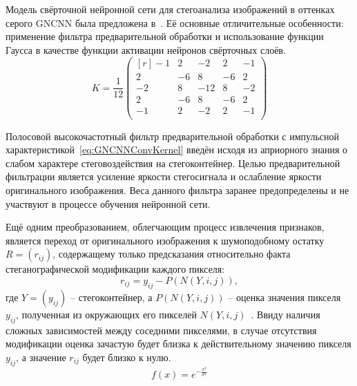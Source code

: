 Модель свёрточной нейронной сети для стегоанализа изображений в оттенках серого GNCNN была предложена в~\cite{GNCNN}. Её основные отличительные особенности: применение фильтра предварительной обработки и использование функции Гаусса в качестве функции активации нейронов свёрточных слоёв.
\begin{equation}
\label{eq:GNCNNConvKernel}
K = \frac{1}{12}
\begin{pmatrix*}[r]
    -1 &  2 &    -2 &  2 & -1 \\
     2 & -6 &     8 & -6 &  2 \\
    -2 &  8 & -12 &  8 & -2 \\
     2 & -6 &     8 & -6 &  2 \\
    -1 &  2 &    -2 &  2 & -1 \\
\end{pmatrix*}
\end{equation}

Полосовой высокочастотный фильтр предварительной обработки с импульсной характеристикой~\eqref{eq:GNCNNConvKernel} введён исходя из априорного знания о слабом характере стеговоздействия на стегоконтейнер. Целью предварительной фильтрации является усиление яркости стегосигнала и ослабление яркости оригинального изображения. Веса данного фильтра заранее предопределены и не участвуют в процессе обучения нейронной сети.

Ещё одним преобразованием, облегчающим процесс извлечения признаков, является переход от оригинального изображения к шумоподобному остатку $ R = (r_{ij}) $, содержащему только предсказания относительно факта стеганографической модификации каждого пикселя:
\begin{equation*}
r_{ij} = y_{ij} - P(N(Y, i, j)),
\end{equation*}
где $ Y = (y_{ij}) $ – стегоконтейнер, а $ P(N(Y, i, j)) $ – оценка значения пикселя $ y_{ij} $, полученная из окружающих его пикселей $ N(Y, i, j) $~\cite{FridrichNoiseResidual}. Ввиду наличия сложных зависимостей между соседними пикселями, в случае отсутствия модификации оценка зачастую будет близка к действительному значению пикселя $ y_{ij} $, а значение $ r_{ij} $ будет близко к нулю.
\begin{equation}
\label{eq:GaussianFunction}
f(x) = e^{-\frac{x^2}{\sigma^2}}
\end{equation}


